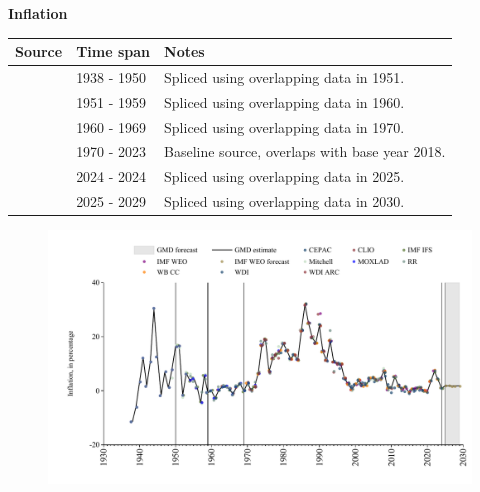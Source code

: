 \documentclass[12pt,a4paper,landscape]{article}
\begin{document}
\begin{adjustbox}{max totalsize={\paperwidth}{\paperheight},center}
\begin{minipage}[t][\textheight][t]{\textwidth}
\vspace*{0.5cm}
{}
\begin{center}
{\Large\bfseries Inflation}
\end{center}
\vspace{0.5cm}
\begin{table}[H]
\centering
\small
\begin{tabular}{|l|l|l|}
\hline
\textbf{Source} & \textbf{Time span} & \textbf{Notes} \\
\hline
\rowcolor{white}\cite{MOXLAD}& 1938 - 1950 &Spliced using overlapping data in 1951. \\
\rowcolor{lightgray}\cite{IMF_IFS}& 1951 - 1959 &Spliced using overlapping data in 1960. \\
\rowcolor{white}\cite{WDI}& 1960 - 1969 &Spliced using overlapping data in 1970. \\
\rowcolor{lightgray}\cite{WB_CC}& 1970 - 2023 &Baseline source, overlaps with base year 2018. \\
\rowcolor{white}\cite{WDI}& 2024 - 2024 &Spliced using overlapping data in 2025. \\
\rowcolor{lightgray}\cite{IMF_WEO_forecast}& 2025 - 2029 &Spliced using overlapping data in 2030. \\
\hline
\end{tabular}
\end{table}
\begin{figure}[H]
\centering
\includegraphics[width=\textwidth,height=0.6\textheight,keepaspectratio]{graphs/SLV_infl.pdf}
\end{figure}
\end{minipage}
\end{adjustbox}
\end{document}
